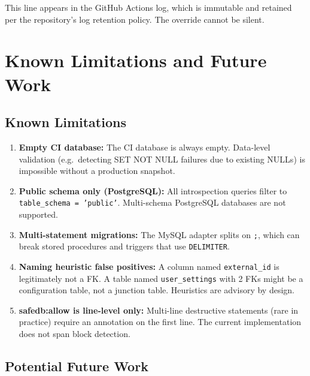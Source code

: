 \documentclass[12pt,a4paper]{report}
\begin{document}
This line appears in the GitHub Actions log, which is immutable and retained per
the repository's log retention policy. The override cannot be silent.

\chapter{Known Limitations and Future Work}

\section{Known Limitations}

\begin{enumerate}
  \item \textbf{Empty CI database:} The CI database is always empty. Data-level
        validation (e.g.\ detecting SET NOT NULL failures due to existing NULLs)
        is impossible without a production snapshot.

  \item \textbf{Public schema only (PostgreSQL):} All introspection queries
        filter to \texttt{table\_schema = 'public'}. Multi-schema PostgreSQL databases
        are not supported.

  \item \textbf{Multi-statement migrations:} The MySQL adapter splits on \texttt{;},
        which can break stored procedures and triggers that use \texttt{DELIMITER}.

  \item \textbf{Naming heuristic false positives:} A column named
        \texttt{external\_id} is legitimately not a FK. A table named
        \texttt{user\_settings} with 2 FKs might be a configuration table, not a
        junction table. Heuristics are advisory by design.

  \item \textbf{safedb:allow is line-level only:} Multi-line destructive
        statements (rare in practice) require an annotation on the first line.
        The current implementation does not span block detection.
\end{enumerate}

\section{Potential Future Work}
\end{document}
